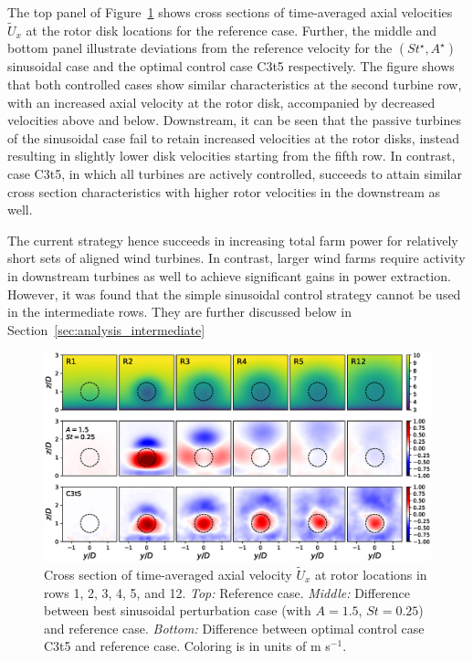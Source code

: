 The top panel of Figure~\ref{fig:cross_section_sinus} shows cross sections of time-averaged axial velocities $\widetilde{U}_x$ at the rotor disk locations for the reference case. Further, the middle and bottom panel illustrate deviations from the reference velocity for the $(St^\star, A^\star)$ sinusoidal case and the optimal control case C3t5 respectively.  The figure shows that both controlled cases show similar characteristics at the second turbine row, with an increased axial velocity at the rotor disk, accompanied by decreased velocities above and below. Downstream, it can be seen that the passive turbines of the sinusoidal case fail to retain increased velocities at the rotor disks, instead resulting in slightly lower disk velocities starting from the fifth row. In contrast, case C3t5, in which all turbines are actively controlled, succeeds to attain similar cross section characteristics with higher rotor velocities in the downstream as well. 

The current strategy hence succeeds in increasing total farm power for relatively short sets of aligned wind turbines. In contrast, larger wind farms require activity in downstream turbines as well to achieve significant gains in power extraction. However, it was found that the simple sinusoidal control strategy cannot be used in the intermediate rows. They are further discussed below in Section~\ref{sec:analysis_intermediate}

\begin{figure}
		\centering
		\includegraphics[width=\textwidth]{chapters/analysis_induction_control/frontviews_allc3t5.eps}
		\caption[Cross section of time-averaged axial velocity $\widetilde{U}_x$ at rotor locations in rows 1, 2, 3, 4, 5, and 12.]{Cross section of time-averaged axial velocity $\widetilde{U}_x$ at rotor locations in rows 1, 2, 3, 4, 5, and 12. \emph{Top: } Reference case. \emph{Middle: } Difference between best sinusoidal perturbation case (with $A = 1.5$, $St = 0.25$) and reference case. \emph{Bottom: } Difference between optimal control case C3t5 and reference case. Coloring is in units of m s$^{-1}$. \label{fig:cross_section_sinus}}
\end{figure}


